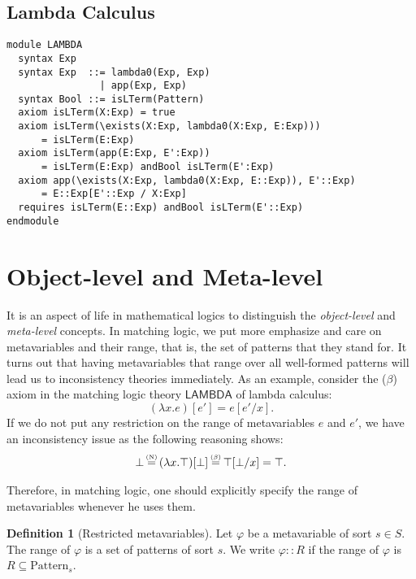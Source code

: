 \documentclass[UTF8]{article}
\newcounter{thmcounter}
\theoremstyle{plain}
\theoremstyle{definition}
\newtheorem{definition}[thmcounter]{Definition}
\theoremstyle{remark}
\newcommand{\LAMBDA}{\mathsf{LAMBDA}}
\newcommand{\xeq}[1]
    {\stackrel{\mathclap{\normalfont\tiny\mbox{#1}}}{=}}
\begin{document}
\subsection{Lambda Calculus}

\begin{Verbatim}
module LAMBDA
  syntax Exp
  syntax Exp  ::= lambda0(Exp, Exp)
                | app(Exp, Exp)
  syntax Bool ::= isLTerm(Pattern)
  axiom isLTerm(X:Exp) = true
  axiom isLTerm(\exists(X:Exp, lambda0(X:Exp, E:Exp)))
      = isLTerm(E:Exp)
  axiom isLTerm(app(E:Exp, E':Exp))
      = isLTerm(E:Exp) andBool isLTerm(E':Exp)
  axiom app(\exists(X:Exp, lambda0(X:Exp, E::Exp)), E'::Exp)
      = E::Exp[E'::Exp / X:Exp]
  requires isLTerm(E::Exp) andBool isLTerm(E'::Exp)
endmodule
\end{Verbatim}


\section{Object-level and Meta-level}

It is an aspect of life in mathematical logics to distinguish the \emph{object-level} and \emph{meta-level} concepts. In matching logic, we put more emphasize and care on metavariables and their range, that is, the set of patterns that they stand for. It turns out that having metavariables that range over all well-formed patterns will lead us to inconsistency theories immediately. As an example, consider the ($\beta$) axiom in the matching logic theory $\LAMBDA$ of lambda calculus:
\begin{equation*}
(\lambda x . e) [e'] = e[e' / x].
\end{equation*}
If we do not put any restriction on the range of metavariables $e$ and $e'$, we have an inconsistency issue as the following reasoning shows:
\begin{align*}
\bot \xeq{(N)} (\lambda x . \top)[\bot] \xeq{($\beta$)} \top[\bot / x] = \top.
\end{align*}

Therefore, in matching logic, one should explicitly specify the range of metavariables whenever he uses them.

\begin{definition}[Restricted metavariables]
	Let $\varphi$ be a metavariable of sort $s \in S$. The range of $\varphi$ is a set of patterns of sort $s$. We write $\varphi :: R$ if the range of $\varphi$ is $R \subseteq \mathrm{Pattern}_s$.
\end{definition}
\end{document}
